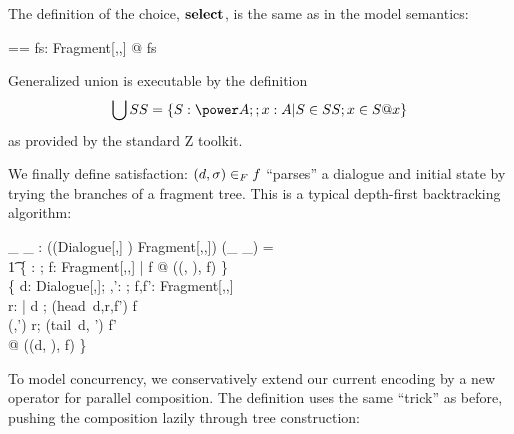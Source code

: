 The definition of the choice, $\mathop{{\mathbf{select}}}$, is the same as in the
model semantics: 

\begin{zedgroup}
\begin{axdef}[\alpha,\pi,\Sigma]
  \ucselect == 
    \lambda fs: \power Fragment[\alpha,\pi,\Sigma] @ \bigcup fs
\end{axdef}
\end{zedgroup}
\noindent
Generalized union is executable by the definition
$$ \bigcup SS = \{S: \power A; ; x: A | S \in SS; x \in S @ x\}$$
as provided by the standard Z toolkit.

We finally define satisfaction: $(d,\sigma) \in_{F} f$
``parses'' a dialogue and initial state by trying the branches of a
fragment tree. This is a typical depth-first backtracking algorithm:

\begin{zedgroup}
\begin{zdirectives}
  \zrelation{(\_ \ucin \_)}
\end{zdirectives}
\begin{axdef}[\alpha,\pi,\Sigma]
  \_ \ucin \_ : \power(\<(Dialogue[\alpha,\pi] \cross \Sigma) \cross 
                  Fragment[\alpha,\pi,\Sigma])\>
\where
  (\_ \ucin \_) = \\\t1
  \<
  \{ \< 
     \sigma: \Sigma; f: Fragment[\alpha,\pi,\Sigma] | \uceod \in f %
     @ ((\langle\rangle, \sigma), f) \} ~ \cup \\\>
  \{ \< 
     d: Dialogue[\alpha,\pi]; \sigma,\sigma': \Sigma;
     f,f': Fragment[\alpha,\pi,\Sigma] \\ 
      r: \Sigma \rel \Sigma %
     | \<d \neq \langle\rangle; \ucbr(head~d,r,f') \in f \\ 
       (\sigma,\sigma') \in r;
       (tail~d, \FORCE \sigma') \ucin f' \\\>
     @ ((d, \sigma), f)
   \}\>\>
\end{axdef}
\end{zedgroup}


To model concurrency, we conservatively extend our current encoding by
a new operator for parallel composition.  The definition uses the same
``trick'' as before, pushing the composition lazily through tree
construction:

